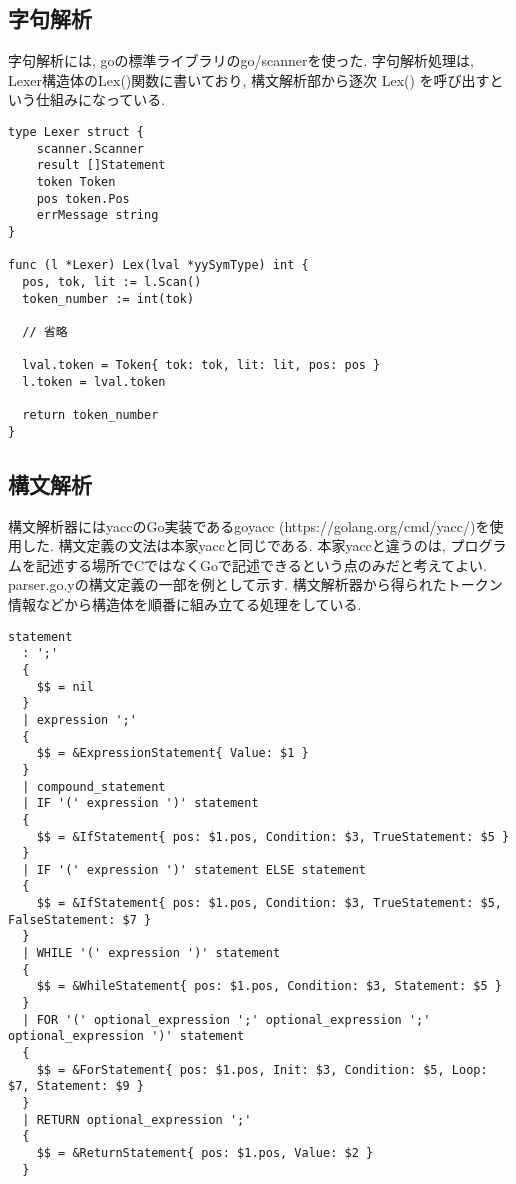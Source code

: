 \documentclass[a4j]{jarticle}
\begin{document}
\subsection{字句解析}
字句解析には, goの標準ライブラリのgo/scannerを使った. 字句解析処理は, Lexer構造体のLex()関数に書いており, 構文解析部から逐次 Lex() を呼び出すという仕組みになっている. \\

\begin{verbatim}
type Lexer struct {
    scanner.Scanner
    result []Statement
    token Token
    pos token.Pos
    errMessage string
}

func (l *Lexer) Lex(lval *yySymType) int {
  pos, tok, lit := l.Scan()
  token_number := int(tok)

  // 省略

  lval.token = Token{ tok: tok, lit: lit, pos: pos }
  l.token = lval.token

  return token_number
}
\end{verbatim}

\subsection{構文解析}

構文解析器にはyaccのGo実装であるgoyacc (https://golang.org/cmd/yacc/)を使用した. 構文定義の文法は本家yaccと同じである. 本家yaccと違うのは, プログラムを記述する場所でCではなくGoで記述できるという点のみだと考えてよい. \\

parser.go.yの構文定義の一部を例として示す. 構文解析器から得られたトークン情報などから構造体を順番に組み立てる処理をしている.

\begin{verbatim}
statement
  : ';'
  {
    $$ = nil
  }
  | expression ';'
  {
    $$ = &ExpressionStatement{ Value: $1 }
  }
  | compound_statement
  | IF '(' expression ')' statement
  {
    $$ = &IfStatement{ pos: $1.pos, Condition: $3, TrueStatement: $5 }
  }
  | IF '(' expression ')' statement ELSE statement
  {
    $$ = &IfStatement{ pos: $1.pos, Condition: $3, TrueStatement: $5, FalseStatement: $7 }
  }
  | WHILE '(' expression ')' statement
  {
    $$ = &WhileStatement{ pos: $1.pos, Condition: $3, Statement: $5 }
  }
  | FOR '(' optional_expression ';' optional_expression ';' optional_expression ')' statement
  {
    $$ = &ForStatement{ pos: $1.pos, Init: $3, Condition: $5, Loop: $7, Statement: $9 }
  }
  | RETURN optional_expression ';'
  {
    $$ = &ReturnStatement{ pos: $1.pos, Value: $2 }
  }
\end{verbatim}
\end{document}

